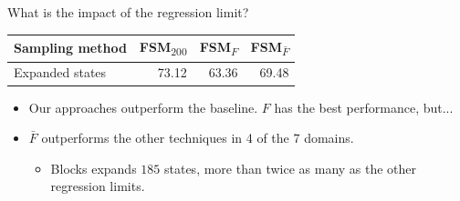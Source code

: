 \documentclass[10pt]{beamer}
\providecommand{\facts}{\ensuremath{F}\xspace}
\providecommand{\meanfx}{\ensuremath{\bar F}\xspace}
\providecommand{\default}{\ensuremath{200}\xspace}
\begin{document}
\begin{frame}{\small What is the impact of the regression limit?} %
\begin{table}[]
\begin{tabular}{l|rrr}
    Sampling method & FSM\textsubscript{\default} & FSM\textsubscript{\facts} & FSM\textsubscript{\meanfx} \\
    \hline
    Expanded states & 73.12 & 63.36 & 69.48 \\
\end{tabular}
\end{table}
 {
\vspace{3.3cm}
}
 {
\begin{itemize}
    \item Our approaches outperform the baseline. \facts has the best performance, but...
    \item \meanfx outperforms the other techniques in 4 of the 7 domains.
    \begin{itemize}
        \item Blocks expands $185$ states, more than twice as many as the other regression limits.
    \end{itemize}
\end{itemize}
\vspace{0.55cm}
}
\end{frame}
\end{document}
